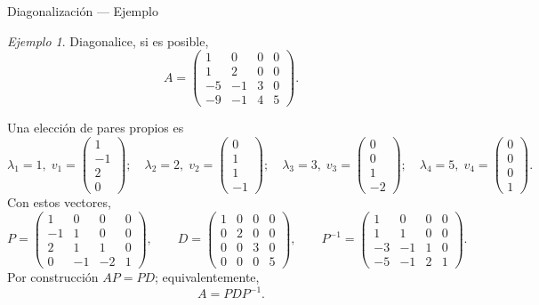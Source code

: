 \documentclass[aspectratio=169,11pt]{beamer}
\theoremstyle{remark}
\newtheorem{Ejem}[definicion]{Ejemplo}
\begin{document}
\begin{frame}[shrink=5]{Diagonalización — Ejemplo}
\footnotesize
\begin{Ejem}


Diagonalice, si es posible,
\[
A=\begin{pmatrix}1 & 0 & 0 & 0\\1 & 2 & 0 & 0\\-5 & -1 & 3 & 0\\-9 & -1 & 4 & 5\end{pmatrix}.
\]

\scriptsize
Una elección de pares propios es
\[
\lambda_1=1,\;v_1=\begin{pmatrix}1\\-1\\2\\0\end{pmatrix};\quad \lambda_2=2,\;v_2=\begin{pmatrix}0\\1\\1\\-1\end{pmatrix};\quad \lambda_3=3,\;v_3=\begin{pmatrix}0\\0\\1\\-2\end{pmatrix};\quad \lambda_4=5,\;v_4=\begin{pmatrix}0\\0\\0\\1\end{pmatrix}.
\]
Con estos vectores,
\[
P=\begin{pmatrix}1 & 0 & 0 & 0\\-1 & 1 & 0 & 0\\2 & 1 & 1 & 0\\0 & -1 & -2 & 1\end{pmatrix},\qquad D=\begin{pmatrix}1 & 0 & 0 & 0\\0 & 2 & 0 & 0\\0 & 0 & 3 & 0\\0 & 0 & 0 & 5\end{pmatrix},\qquad P^{-1}=\begin{pmatrix}1 & 0 & 0 & 0\\1 & 1 & 0 & 0\\-3 & -1 & 1 & 0\\-5 & -1 & 2 & 1\end{pmatrix}.
\]
Por construcción $AP=PD$; equivalentemente,
\[
\boxed{A=PDP^{-1}}.
\]

\end{Ejem}
\end{frame}
\end{document}
